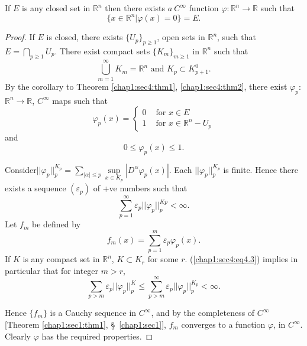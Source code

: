 \begin{lemma}\label{chap1:sec4:lem3}%
  If $E$ is any closed set in $\mathbb{R}^n$ then there exists $a~
  C^\infty$ function $\varphi: \mathbb{R}^n \to \mathbb{R}$ such
  that  
  $$
  \{ x \in \mathbb{R}^n | \varphi (x) = 0\} = E. 
  $$
\end{lemma}

\begin{proof}%
  If $E$ is closed, there exists $\{U_p \}_{p \geq 1}$, open sets in
  $\mathbb{R}^n$, such that $E = \bigcap\limits_{ p \geq 1}
  U_p$. There exist compact sets $\{K_m\}_{m \geq 1}$ in
  $\mathbb{R}^n$ such that  
  $$
  \bigcup ^\infty _{ m = 1} K_m = \mathbb{R}^n\text{ and } K_p \subset
  K^0_{ p +1}.  
  $$
  By the corollary to Theorem \ref{chap1:sec4:thm1}, 
  \ref{chap1:sec4:thm2}, there exist $\varphi_p$: 
  $\mathbb{R}^n \to \mathbb{R}$, $C^\infty$ maps such that  
  \begin{equation*}
    \varphi_p (x) = 
    \begin{cases}
      0 & \text{ for } x \in E \\
      1 & \text{ for } x \in \mathbb{R}^n - U_p   \tag{1}
    \end{cases}
  \end{equation*}
  and 
  \begin{equation}
    0 \leq \varphi _p (x) \leq 1. \tag{2}
  \end{equation}

  Consider\pageoriginale $|| \varphi _p || ^{K_p}_p = \sum\limits_{ |\alpha | \leq p}
  \sup\limits_{ x \in K_p} | D^\alpha \varphi _p (x) |$. Each $||
  \varphi _p || ^{K_p}_p$ is finite. Hence there exists a sequence
  $(\varepsilon_p)$ of +ve numbers such that  
  \begin{equation*}
    \sum^\infty_{ p = 1} \varepsilon_p || \varphi _p || ^{Kp}_p <
    \infty.  \tag{4.3}\label{chap1:sec4:eq4.3} 
  \end{equation*}
  Let $f_m$ be defined by 
  $$
  f_m (x) = \sum^m _{p = 1} \varepsilon _p \varphi _p (x). 
  $$
  If $K$ is any compact set in $\mathbb{R}^n$, $K \subset K_r$ for some
  $r$. (\ref{chap1:sec4:eq4.3}) implies in particular that for integer
  $m > r$,   
  $$
  \sum_{ p > m} \varepsilon_p || \varphi_{p} ||^K_p \leq \sum^\infty _{ p > m}
  \varepsilon _p || \varphi _p ||^{K_p}_p < \infty.  
  $$
  
  Hence $\{f_m\}$ is a Cauchy sequence in $C^\infty$, and by the
  completeness of $C^\infty$ [Theorem \ref{chap1:sec1:thm1},
    \S\ \ref{chap1:sec1}], $f_m$ converges to
  a function $\varphi$, in $C^\infty$. Clearly $\varphi$ has the
  required properties.  
\end{proof}

